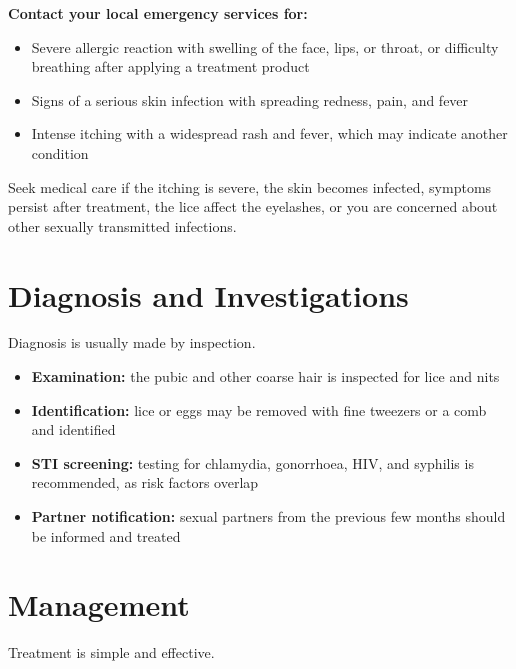 \textbf{Contact your local emergency services for:}
\begin{itemize}
    \item Severe allergic reaction with swelling of the face, lips, or throat, or difficulty breathing after applying a treatment product
    \item Signs of a serious skin infection with spreading redness, pain, and fever
    \item Intense itching with a widespread rash and fever, which may indicate another condition
\end{itemize}

Seek medical care if the itching is severe, the skin becomes infected, symptoms persist after treatment, the lice affect the eyelashes, or you are concerned about other sexually transmitted infections.

\section*{Diagnosis and Investigations}
Diagnosis is usually made by inspection.

\begin{itemize}
    \item \textbf{Examination:} the pubic and other coarse hair is inspected for lice and nits
    \item \textbf{Identification:} lice or eggs may be removed with fine tweezers or a comb and identified
    \item \textbf{STI screening:} testing for chlamydia, gonorrhoea, HIV, and syphilis is recommended, as risk factors overlap
    \item \textbf{Partner notification:} sexual partners from the previous few months should be informed and treated
\end{itemize}

\section*{Management}
Treatment is simple and effective.

